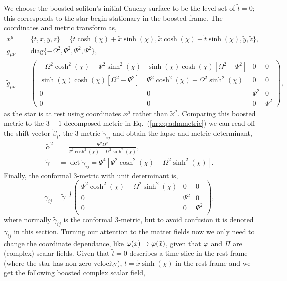 We choose the boosted soliton's initial Cauchy surface to be the level set of $\tilde{t}=0$; this corresponds to the star begin stationary in the boosted frame. The coordinates and metric transform as,
\begin{align}
 x^\mu &= \{ t,x,y,z\} = \{\tilde{t}\cosh(\chi) + \tilde{x} \sinh(\chi),\tilde{x}\cosh(\chi)+\tilde{t}\sinh(\chi),\tilde{y},\tilde{z}\} ,\\
 g_{\mu\nu} &= \mathrm{diag} \{ -\Omega^2, \Psi^2,  \Psi^2, \Psi^2\} ,\\
 \tilde{g}_{\mu\nu}&=\begin{pmatrix} -\Omega^2\cosh^2 (\chi) + \Psi^2 \sinh^2 (\chi) & \sinh(\chi)\cosh(\chi)\left[\Omega^2-\Psi^2\right] & 0& 0 \\  \sinh(\chi)\cosh(\chi)\left[\Omega^2-\Psi^2\right] & \Psi^2 \cosh^2 (\chi) - \Omega^2 \sinh^2 (\chi) & 0 & 0\\ 0 & 0&\Psi^2&0 \\ 0&0&0&\Psi^2\end{pmatrix},
 \end{align}
 as the star is at rest using coordinates $x^\mu$ rather than $\tilde{x}^\mu$.
Comparing this boosted metric to the $3+1$ decomposed metric in Eq.~(\ref{nr:eq:admmetric}) we can read off the shift vector $\tilde{\beta}_i$, the 3 metric $\tilde{\gamma}_{ij}$ and obtain the lapse and metric determinant,
\begin{align} 
\tilde{\alpha}^2 &= \frac{\Psi ^2 \Omega ^2}{\Psi ^2 \cosh ^2(\chi) -\Omega ^2 \sinh ^2(\chi) },\\ 
\tilde{\gamma} &= \det \tilde{\gamma}_{ij} = \Psi^4\left[ \Psi^2 \cosh^2 (\chi) - \Omega^2 \sinh^2(\chi)\right].
\end{align}
Finally, the conformal 3-metric with unit determinant is, 
\begin{equation} \bar{\gamma}_{ij} = \tilde{\gamma}^{-\frac{1}{3}}\left(
\begin{array}{ccc}
 \Psi ^2 \cosh ^2(\chi) -\Omega ^2 \sinh ^2(\chi)  & 0 & 0 \\
 0 & \Psi ^2 & 0 \\
 0 & 0 & \Psi ^2 \\
\end{array}
\right),\end{equation}
where normally $\tilde{\gamma}_{ij}$ is the conformal 3-metric, but to avoid confusion it is denoted $\bar{\gamma}_{ij}$ in this section. Turning our attention to the matter fields now we only need to change the coordinate dependance, like $\varphi(x)\rightarrow \varphi(\tilde{x})$, given that $\varphi$ and $\Pi$ are (complex) scalar fields. Given that $\tilde{t}=0$ describes a time slice in the rest frame (where the star has non-zero velocity), $t = \tilde{x}\sinh(\chi)$ in the rest frame and we get the following boosted complex scalar field,
